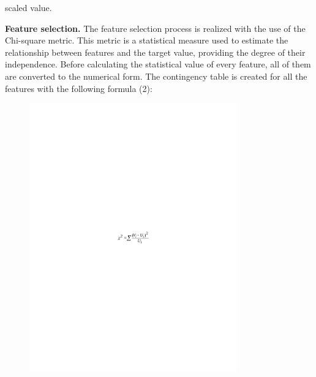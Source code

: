 scaled value.

{\bfseries Feature selection.} The feature selection process is realized
with the use of the Chi-square metric. This metric is a statistical
measure used to estimate the relationship between features and the
target value, providing the degree of their independence. Before
calculating the statistical value of every feature, all of them are
converted to the numerical form. The contingency table is created for
all the features with the following formula (2):

\begin{figure}[H]
	\centering
	\includegraphics[width=0.8\textwidth]{media/ict/image33}
	\caption*{}
\end{figure}


